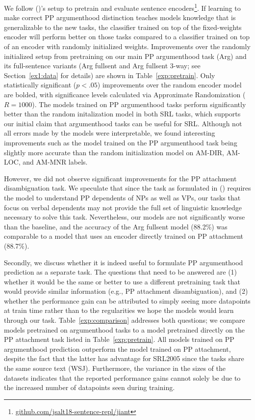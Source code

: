 \documentclass[letterpaper]{article} %
\begin{document}
We follow \citeauthor{bowman2018looking} (\citeyear{bowman2018looking})'s setup to pretrain and evaluate sentence encoders\footnote{\url{github.com/jsalt18-sentence-repl/jiant}}. If learning to make correct PP argumenthood distinction teaches models knowledge that is generalizable to the new tasks, the classifier trained on top of the fixed-weights encoder will perform better on those tasks compared to a classifier trained on top of an encoder with randomly initialized weights. Improvements over the randomly initialized setup from pretraining on our main PP argumenthood task (Arg) and its full-sentence variants (Arg fullsent and Arg fullsent 3-way; see Section~\ref{ex1:data} for details) are shown in Table~\ref{exp:pretrain}. Only statistically significant ($p<.05$) improvements over the random encoder model are bolded, with significance levels calculated via Approximate Randomization \cite{yeh2000more} ($R=1000$). The models trained on PP argumenthood tasks perform significantly better than the random initalization model in both SRL tasks, which supports our initial claim that argumenthood tasks can be useful for SRL. Although not all errors made by the models were interpretable, we found interesting improvements such as the model trained on the PP argumenthood task being slightly more accurate than the random initialization model on \textsc{AM-DIR, AM-LOC}, and \textsc{AM-MNR} labels.

However, we did not observe significant improvements for the PP attachment disambiguation task. We speculate that since the task as formulated in \citeauthor{belinkov2014exploring} (\citeyear{belinkov2014exploring}) requires the model to understand PP dependents of NPs as well as VPs, our tasks that focus on verbal dependents may not provide the full set of linguistic knowledge necessary to solve this task. Nevertheless, our models are not significantly worse than the baseline, and the accuracy of the Arg fullsent model (88.2\%) was comparable to a model that uses an encoder directly trained on PP attachment (88.7\%). 

Secondly, we discuss whether it is indeed useful to formulate PP argumenthood prediction as a separate task. The questions that need to be answered are (1) whether it would be the same or better to use a different pretraining task that would provide similar information (e.g., PP attachment disambiguation), and (2) whether the performance gain can be attributed to simply seeing more datapoints at train time rather than to the regularities we hope the models would learn through our task. Table~\ref{exp:comparison} addresses both questions; we compare models pretrained on argumenthood tasks to a model pretrained directly on the PP attachment task listed in Table~\ref{exp:pretrain}. All models trained on PP argumenthood prediction outperform the model trained on PP attachment, despite the fact that the latter has advantage for SRL2005 since the tasks share the same source text (WSJ). Furthermore, the variance in the sizes of the datasets indicates that the reported performance gains cannot solely be due to the increased number of datapoints seen during training.
\end{document}
